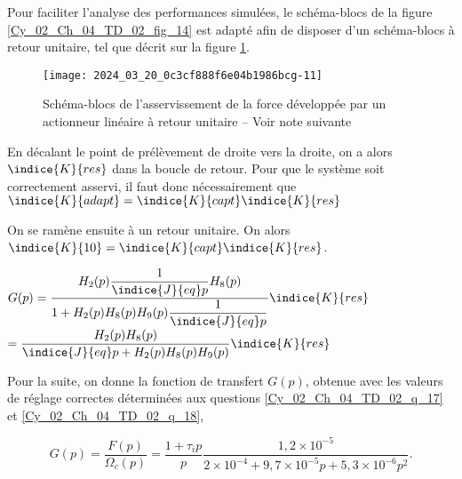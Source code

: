 \ifprof
\else
Pour faciliter l'analyse des performances simulées, le schéma-blocs de la figure \ref{Cy_02_Ch_04_TD_02_fig_14} est adapté afin de disposer d'un schéma-blocs 
à retour unitaire, tel que décrit sur la figure \ref{Cy_02_Ch_04_TD_02_fig_15}.


\begin{figure}[!h]
\texttt{[image: 2024\_03\_20\_0c3cf888f6e04b1986bcg-11]}
\caption{Schéma-blocs de l'asservissement de la force développée par un actionneur linéaire à retour unitaire -- Voir note suivante \label{Cy_02_Ch_04_TD_02_fig_15}}
\end{figure}
\fi
{}


\ifprof
\begin{corrige}
En décalant le point de prélèvement de droite vers la droite, on a alors $\indice{K}{res}$ dans la boucle de retour. 
Pour que le système soit correctement asservi, il faut donc nécessairement que 
$\indice{K}{adapt} = \indice{K}{capt}\indice{K}{res}$

On se ramène ensuite à un retour unitaire. On alors $\indice{K}{10} = \indice{K}{capt}\indice{K}{res}$.
\end{corrige}
\else
\fi

\ifprof
\begin{corrige}
$G(p)=\dfrac{H_2(p)\dfrac{1}{\indice{J}{eq}p}H_8(p)}{1+H_2(p)H_8(p)H_9(p)\dfrac{1}{\indice{J}{eq}p}}\indice{K}{res}$
$ = \dfrac{H_2(p)H_8(p)}{\indice{J}{eq}p+H_2(p)H_8(p)H_9(p)}\indice{K}{res}$
\end{corrige}
\else
\fi

Pour la suite, on donne la fonction de transfert $G(p)$, obtenue avec les valeurs de réglage correctes déterminées aux questions \ref{Cy_02_Ch_04_TD_02_q_17} et \ref{Cy_02_Ch_04_TD_02_q_18},

$$
G(p)=\frac{F(p)}{\Omega_{c}(p)}=\frac{1+\tau_{i} p}{p} \frac{1,2 \times 10^{-5}}{2 \times 10^{-4}+9,7 \times 10^{-5} p+5,3 \times 10^{-6} p^{2}} .
$$

